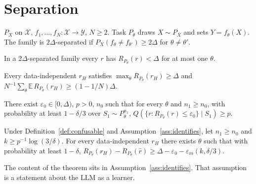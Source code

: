 \section{Separation}\label{sec:separation}

\begin{definition}\label{def:confusable}
$P_X$ on $\mathcal X$, $f_1,\dots,f_N:\mathcal X\to\mathcal Y$, $N\ge2$.
Task $P_\theta$ draws $X\sim P_X$ and sets $Y=f_\theta(X)$.
The family is $2\Delta$-separated if $P_X(f_\theta\ne f_{\theta'})\ge2\Delta$ for $\theta\ne\theta'$.
\end{definition}

\begin{lemma}\label{lem:confusable}
In a $2\Delta$-separated family every $r$ has $R_{P_\theta}(r)<\Delta$ for at most one $\theta$.
\end{lemma}

\begin{proposition}\label{prop:lower-bound}
Every data-independent $r_H$ satisfies $\max_\theta R_{P_\theta}(r_H)\ge\Delta$ and $N^{-1}\sum_\theta\mathbb E\,R_{P_\theta}(r_H)\ge(1-1/N)\Delta$.
\end{proposition}

\begin{assumption}\label{ass:identifies}
There exist $\varepsilon_0\in[0,\Delta)$, $p>0$, $n_0$ such that for every $\theta$ and $n_1\ge n_0$, with probability at least $1-\delta/3$ over $S_1\sim P_\theta^{n_1}$, $Q(\{r:R_{P_\theta}(r)\le\varepsilon_0\}\mid S_1)\ge p$.
\end{assumption}

\begin{theorem}[Separation]\label{thm:separation}
Under Definition~\ref{def:confusable} and Assumption~\ref{ass:identifies}, let $n_1\ge n_0$ and $k\ge p^{-1}\log(3/\delta)$.
For every data-independent $r_H$ there exists $\theta$ such that with probability at least $1-\delta$, $R_{P_\theta}(r_H)-R_{P_\theta}(\hat r)\ge\Delta-\varepsilon_0-\varepsilon_m(k,\delta/3)$.
\end{theorem}

The content of the theorem sits in Assumption~\ref{ass:identifies}.
That assumption is a statement about the LLM as a learner.
